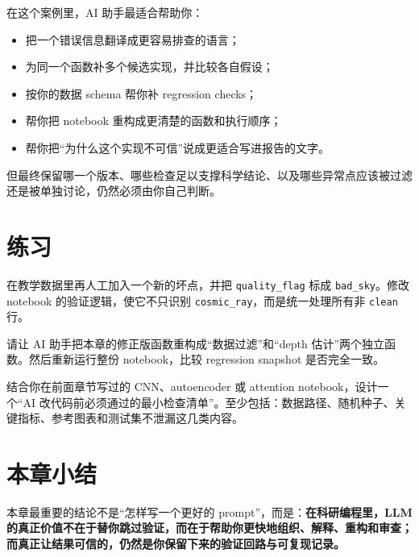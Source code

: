 在这个案例里，AI 助手最适合帮助你：

\begin{itemize}
    \item 把一个错误信息翻译成更容易排查的语言；
    \item 为同一个函数补多个候选实现，并比较各自假设；
    \item 按你的数据 schema 帮你补 regression checks；
    \item 帮你把 notebook 重构成更清楚的函数和执行顺序；
    \item 帮你把“为什么这个实现不可信”说成更适合写进报告的文字。
\end{itemize}

但最终保留哪一个版本、哪些检查足以支撑科学结论、以及哪些异常点应该被过滤还是被单独讨论，仍然必须由你自己判断。

\section{练习}

\begin{exercisebox}[基础练习]
在教学数据里再人工加入一个新的坏点，并把 \texttt{quality\_flag} 标成 \texttt{bad\_sky}。修改 notebook 的验证逻辑，使它不只识别 \texttt{cosmic\_ray}，而是统一处理所有非 \texttt{clean} 行。
\end{exercisebox}

\begin{exercisebox}[进阶练习]
请让 AI 助手把本章的修正版函数重构成“数据过滤”和“depth 估计”两个独立函数。然后重新运行整份 notebook，比较 regression snapshot 是否完全一致。
\end{exercisebox}

\begin{exercisebox}[开放练习]
结合你在前面章节写过的 CNN、autoencoder 或 attention notebook，设计一个“AI 改代码前必须通过的最小检查清单”。至少包括：数据路径、随机种子、关键指标、参考图表和测试集不泄漏这几类内容。
\end{exercisebox}

\section{本章小结}

本章最重要的结论不是“怎样写一个更好的 prompt”，而是：\textbf{在科研编程里，LLM 的真正价值不在于替你跳过验证，而在于帮助你更快地组织、解释、重构和审查；而真正让结果可信的，仍然是你保留下来的验证回路与可复现记录。}
